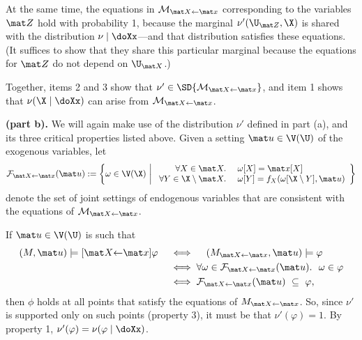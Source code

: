 \begin{subappendices}
\begin{lproof}
\begin{enumerate}
        At the same time, the equations in $\mathcal M_{\mat X{\gets} \mat x}$ corresponding to the variables $\mat Z$ hold with probability 1, because the marginal $\nu'(\U_{\mat Z}, \X)$ is shared with the distribution $\nu \mid \doXx$---and that distribution satisfies these equations. (It suffices to show that they share this particular marginal because the equations for $\mat Z$ do not depend on $\U_{\mat X}$.)
    \end{enumerate}
    Together, items 2 and 3 show that $\nu' \in \SD{\mathcal M_{\mat X{\gets} \mat x}}$, and item 1 shows that $\nu(\X \mid \doXx)$ can arise from $\mathcal M_{\mat X{\gets} \mat x}$. 


    \bigskip

    \textbf{(part b).}
    We will again make use of the distribution $\nu'$ defined in part (a), and its three critical properties listed above. 
    Given a setting $\mat u \in \V(\U)$ of the exogenous variables, let
    \[
        \mathcal F_{\mat X \gets \mat x} (\mat u) 
        := \left\{ \omega \in \V(\X) ~\middle|~
        \begin{array}{rl}
            \forall X \in \mat X.~& \omega[X] = \mat x[X]\\
            \forall Y \in \X \setminus \mat X.~&\omega[Y] = f_X(\omega[\X \setminus Y], \mat u) 
        \end{array}
        \right\} 
    \]
    denote the set of joint settings of endogenous variables that are consistent with the equations of $\mathcal M_{\mat X \gets \mat x}$. 

    If $\mat u \in \V(\U)$ is such that 
    \begin{align*}
        (M, \mat u) \models [\mat X {\gets} \mat x] \varphi
        \quad&\iff\quad
        (M_{\mat X {\gets} \mat x}, \mat u) \models \varphi  \\
        &\iff \forall \omega \in \mathcal F_{\mat X {\gets} \mat x}(\mat u).~~\omega \in \varphi \\
        &\iff 
            \mathcal F_{\mat X {\gets} \mat x}(\mat u)
                ~\subseteq~ \varphi, 
    \end{align*}
    then $\phi$ holds at all points that satisfy the equations of $M_{\mat X {\gets} \mat x}$. So, since $\nu'$ is supported only on such points (property 3), it must be that $\nu'(\varphi) = 1$. By property 1, 
    $\nu'(\varphi) =  \nu(\varphi \mid \doXx)$. 


\end{lproof}
\end{subappendices}

